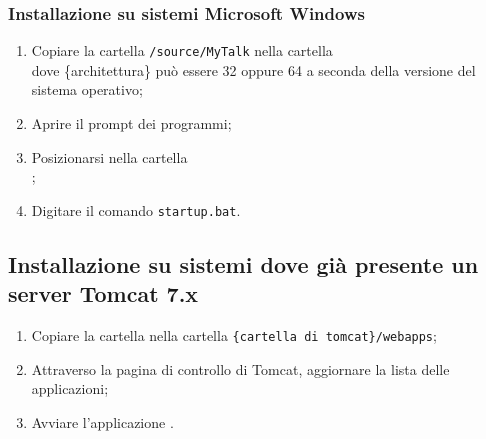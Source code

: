 {{	\subsubsection{Installazione su sistemi Microsoft Windows}{
		\begin{enumerate}
			\item Copiare la cartella \texttt{/source/MyTalk} nella cartella\\  dove \{architettura\} può essere 32 oppure 64 a seconda della versione del sistema operativo;
			\item Aprire il prompt dei programmi;
			\item Posizionarsi nella cartella\\ ;
			\item Digitare il comando \texttt{startup.bat}.
		\end{enumerate}
	}

}

\subsection{Installazione su sistemi dove già presente un server Tomcat 7.x}{
	\begin{enumerate}
		\item Copiare la cartella  nella cartella \texttt{\{cartella di tomcat\}/webapps};
		\item Attraverso la pagina di controllo di Tomcat, aggiornare la lista delle applicazioni;
		\item Avviare l'applicazione .		
		\end{enumerate}
}

}
